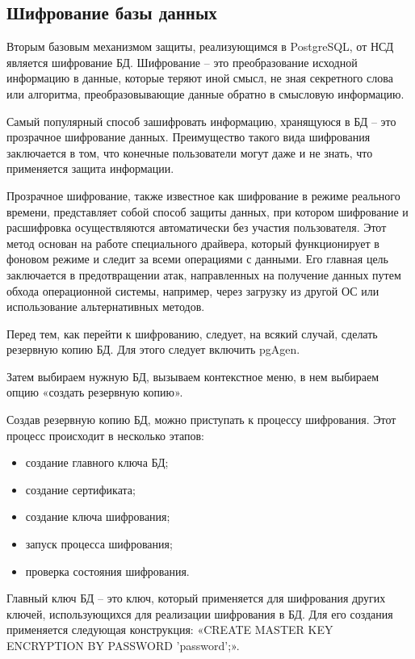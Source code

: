 \subsection{Шифрование базы данных}

Вторым базовым механизмом защиты, реализующимся в PostgreSQL, от НСД является шифрование БД. Шифрование – это преобразование исходной информацию в данные, которые теряют иной смысл, не зная секретного слова или алгоритма, преобразовывающие данные обратно в смысловую информацию.

Самый популярный способ зашифровать информацию, хранящуюся в БД – это прозрачное шифрование данных. Преимущество такого вида шифрования заключается в том, что конечные пользователи могут даже и не знать, что применяется защита информации.

Прозрачное шифрование, также известное как шифрование в режиме реального времени, представляет собой способ защиты данных, при котором шифрование и расшифровка осуществляются автоматически без участия пользователя. Этот метод основан на работе специального драйвера, который функционирует в фоновом режиме и следит за всеми операциями с данными. Его главная цель заключается в предотвращении атак, направленных на получение данных путем обхода операционной системы, например, через загрузку из другой ОС или использование альтернативных методов.

Перед тем, как перейти к шифрованию, следует, на всякий случай, сделать резервную копию БД. Для этого следует включить pgAgen.

Затем выбираем нужную БД, вызываем контекстное меню, в нем выбираем опцию «создать резервную копию».

Создав резервную копию БД, можно приступать к процессу шифрования. Этот процесс происходит в несколько этапов:

\begin{itemize}
    \item создание главного ключа БД;
    \item создание сертификата;
    \item создание ключа шифрования;
    \item запуск процесса шифрования;
    \item проверка состояния шифрования.
\end{itemize}

Главный ключ БД – это ключ, который применяется для шифрования других ключей, использующихся для реализации шифрования в БД. Для его создания применяется следующая конструкция: «CREATE MASTER KEY ENCRYPTION BY PASSWORD 'password';».

